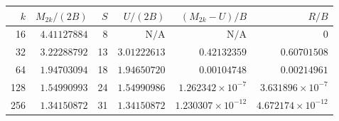 \begin{tabular}{@{}rrrrrr@{}}
\toprule
$k$ & $M_{2k}/(2B)$ & $S$ & $U/(2B)$ & $(M_{2k}-U)/B$ & $R/B$ \\
\midrule
16 & $4.41127884$ & 8 & $\text{N/A}$ & $\text{N/A}$ & $0$ \\
32 & $3.22288792$ & 13 & $3.01222613$ & $0.42132359$ & $0.60701508$ \\
64 & $1.94703094$ & 18 & $1.94650720$ & $0.00104748$ & $0.00214961$ \\
128 & $1.54990993$ & 24 & $1.54990986$ & $1.262342\!\times\!10^{-7}$ & $3.631896\!\times\!10^{-7}$ \\
256 & $1.34150872$ & 31 & $1.34150872$ & $1.230307\!\times\!10^{-12}$ & $4.672174\!\times\!10^{-12}$ \\
\bottomrule
\end{tabular}
